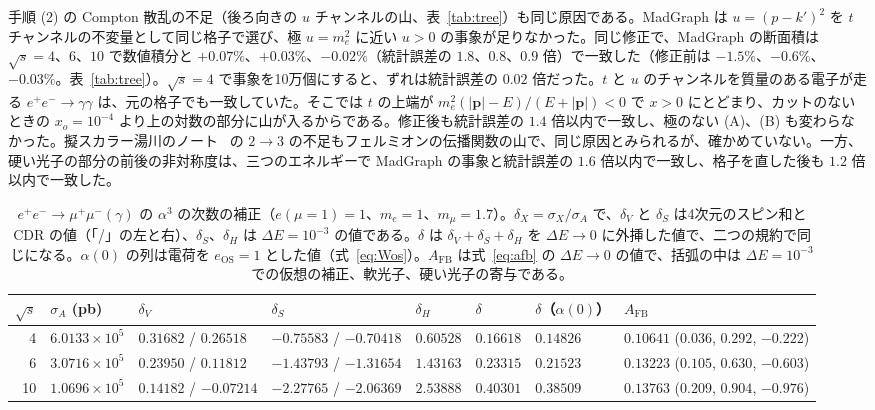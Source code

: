 \documentclass[a4paper,10pt]{ltjsarticle}
\begin{document}
手順 (2) の Compton 散乱の不足（後ろ向きの $u$ チャンネルの山、表~\ref{tab:tree}）も同じ原因である。MadGraph は $u=(p-k')^2$ を $t$ チャンネルの不変量として同じ格子で選び、極 $u=m_e^2$ に近い $u>0$ の事象が足りなかった。同じ修正で、MadGraph の断面積は $\sqrt s=4$、$6$、$10$ で数値積分と $+0.07\%$、$+0.03\%$、$-0.02\%$（統計誤差の $1.8$、$0.8$、$0.9$ 倍）で一致した（修正前は $-1.5\%$、$-0.6\%$、$-0.03\%$。表~\ref{tab:tree}）。$\sqrt s=4$ で事象を10万個にすると、ずれは統計誤差の $0.02$ 倍だった。$t$ と $u$ のチャンネルを質量のある電子が走る $e^+e^-\to\gamma\gamma$ は、元の格子でも一致していた。そこでは $t$ の上端が $m_e^2(|\boldsymbol p|-E)/(E+|\boldsymbol p|)<0$ で $x>0$ にとどまり、カットのないときの $x_o=10^{-4}$ より上の対数の部分に山が入るからである。修正後も統計誤差の $1.4$ 倍以内で一致し、極のない (A)、(B) も変わらなかった。擬スカラー湯川のノート~\cite{yukawanote} の $2\to3$ の不足もフェルミオンの伝播関数の山で、同じ原因とみられるが、確かめていない。一方、硬い光子の部分の前後の非対称度は、三つのエネルギーで MadGraph の事象と統計誤差の $1.6$ 倍以内で一致し、格子を直した後も $1.2$ 倍以内で一致した。

\begin{table}[tbp]
\centering\small
\caption{$e^+e^-\to\mu^+\mu^-(\gamma)$ の $\alpha^3$ の次数の補正（$e(\mu=1)=1$、$m_e=1$、$m_\mu=1.7$）。$\delta_X=\sigma_X/\sigma_A$ で、$\delta_V$ と $\delta_S$ は4次元のスピン和と CDR の値（「/」の左と右）、$\delta_S$、$\delta_H$ は $\Delta E=10^{-3}$ の値である。$\delta$ は $\delta_V+\delta_S+\delta_H$ を $\Delta E\to0$ に外挿した値で、二つの規約で同じになる。$\alpha(0)$ の列は電荷を $e_{\mathrm{OS}}=1$ とした値（式~\eqref{eq:Wos}）。$A_{\mathrm{FB}}$ は式~\eqref{eq:afb} の $\Delta E\to0$ の値で、括弧の中は $\Delta E=10^{-3}$ での仮想の補正、軟光子、硬い光子の寄与である。}
\label{tab:xsec}
\footnotesize\setlength{\tabcolsep}{3.5pt}
\begin{tabular}{rlllllll}
\toprule
$\sqrt s$ & $\sigma_A$ (pb) & $\delta_V$ & $\delta_S$ & $\delta_H$ & $\delta$ & $\delta$（$\alpha(0)$） & $A_{\mathrm{FB}}$ \\
\midrule
4 & $6.0133\times10^{5}$ & $0.31682$ / $0.26518$ & $-0.75583$ / $-0.70418$ & $0.60528$ & $0.16618$ & $0.14826$ & $0.10641$ ($0.036$, $0.292$, $-0.222$) \\
6 & $3.0716\times10^{5}$ & $0.23950$ / $0.11812$ & $-1.43793$ / $-1.31654$ & $1.43163$ & $0.23315$ & $0.21523$ & $0.13223$ ($0.105$, $0.630$, $-0.603$) \\
10 & $1.0696\times10^{5}$ & $0.14182$ / $-0.07214$ & $-2.27765$ / $-2.06369$ & $2.53888$ & $0.40301$ & $0.38509$ & $0.13763$ ($0.209$, $0.904$, $-0.976$) \\
\bottomrule
\end{tabular}
\end{table}
\end{document}
